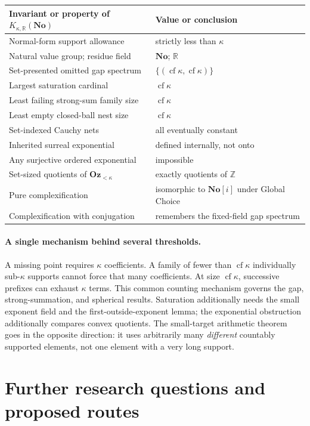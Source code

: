\documentclass[11pt,letterpaper]{article}
\numberwithin{equation}{section}
\theoremstyle{definition}
\theoremstyle{remark}
\newcommand{\R}{\mathbb R}
\newcommand{\No}{\mathbf{No}}
\newcommand{\cf}{\operatorname{cf}}
\newcommand{\Z}{\mathbb Z}
\newcommand{\Oz}{\mathbf{Oz}}
\newcommand{\SC}{\mathbf{No}[i]}
\newcommand{\KN}[2]{K_{#1,#2}(\No)}%
\newcommand{\Ok}{\Oz_{<\kappa}}
\begin{document}
\begin{center}
\small
\begin{tabular}{@{}p{}p{}@{}}
\toprule
Invariant or property of $\KN\kappa\R$ & Value or conclusion \\
\midrule
Normal-form support allowance & strictly less than $\kappa$ \\
Natural value group; residue field & $\No$; $\R$ \\
Set-presented omitted gap spectrum & $\{(\cf\kappa,\cf\kappa)\}$ \\
Largest saturation cardinal & $\cf\kappa$ \\
Least failing strong-sum family size & $\cf\kappa$ \\
Least empty closed-ball nest size & $\cf\kappa$ \\
Set-indexed Cauchy nets & all eventually constant \\
Inherited surreal exponential & defined internally, not onto \\
Any surjective ordered exponential & impossible \\
Set-sized quotients of $\Ok$ & exactly quotients of $\Z$ \\
Pure complexification & isomorphic to $\SC$ under Global Choice \\
Complexification with conjugation & remembers the fixed-field gap spectrum \\
\bottomrule
\end{tabular}
\end{center}

\paragraph{A single mechanism behind several thresholds.}
A missing point requires $\kappa$ coefficients. A family of fewer than $\cf\kappa$ individually sub-$\kappa$ supports cannot force that many coefficients. At size $\cf\kappa$, successive prefixes can exhaust $\kappa$ terms. This common counting mechanism governs the gap, strong-summation, and spherical results. Saturation additionally needs the small exponent field and the first-outside-exponent lemma; the exponential obstruction additionally compares convex quotients. The small-target arithmetic theorem goes in the opposite direction: it uses arbitrarily many \emph{different} countably supported elements, not one element with a very long support.

\section{Further research questions and proposed routes}\label{fkc:sb:sec:questions}
\end{document}
